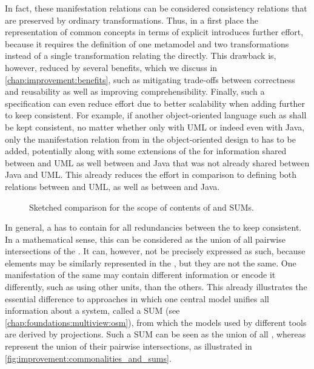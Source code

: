 In fact, these manifestation relations can be considered consistency relations that are preserved by ordinary transformations.
Thus, in a first place the representation of common concepts in terms of explicit \commonalities introduces further effort, because it requires the definition of one metamodel and two transformations instead of a single transformation relating the \metaclasses directly.
This drawback is, however, reduced by several benefits, which we discuss in \autoref{chap:improvement:benefits}, such as mitigating trade-offs between correctness and reusability as well as improving comprehensibility.
Finally, such a specification can even reduce effort due to better scalability when adding further \concretemetamodels to keep consistent.
For example, if another object-oriented language such as \cplusplus shall be kept consistent, no matter whether only with \gls{UML} or indeed even with Java, only the manifestation relation from \commonalities in the object-oriented design \conceptmetamodel to \cplusplus has to be added, potentially along with some extensions of the \conceptmetamodel for information shared between \cplusplus and \gls{UML} as well between \cplusplus and Java that was not already shared between Java and \gls{UML}.
This already reduces the effort in comparison to defining both relations between \cplusplus and \gls{UML}, as well as between \cplusplus and Java.

\begin{figure}
    \centering
    
    \caption[Commonalities compared to ]{Sketched comparison for the scope of contents of \conceptmetamodels and \glspl{SUM}.}
    \label{fig:improvement:commonalities_and_sums}
\end{figure}

In general, a \conceptmetamodel has to contain \commonalities for all redundancies between the \concretemetamodels to keep consistent.
In a mathematical sense, this can be considered as the union of all pairwise intersections of the \concretemetamodels.
It can, however, not be precisely expressed as such, because elements may be similarly represented in the \concretemetamodels, but they are not the same.
One manifestation of the same \commonality may contain different information or encode it differently, such as using other units, than the others.
This already illustrates the essential difference to approaches in which one central model unifies all information about a system, called a \gls{SUM} (see \autoref{chap:foundations:multiview:osm}), from which the models used by different tools are derived by projections.
Such a \gls{SUM} can be seen as the union of all \concretemetamodels, whereas \concretemetamodels represent the union of their pairwise intersections, as illustrated in \autoref{fig:improvement:commonalities_and_sums}.


